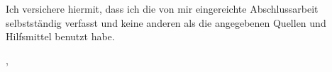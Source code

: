 \thispagestyle{empty}

\vspace*{0.8\textheight}
\noindent
Ich versichere hiermit, dass ich die von mir eingereichte Abschlussarbeit selbstständig verfasst und keine
anderen als die angegebenen Quellen und Hilfsmittel benutzt habe.

\vspace{15mm}
\noindent
\getSubmissionLocation{}, \getSubmissionDate{} \hspace{5cm} \getAuthor{}

\cleardoublepage{}
